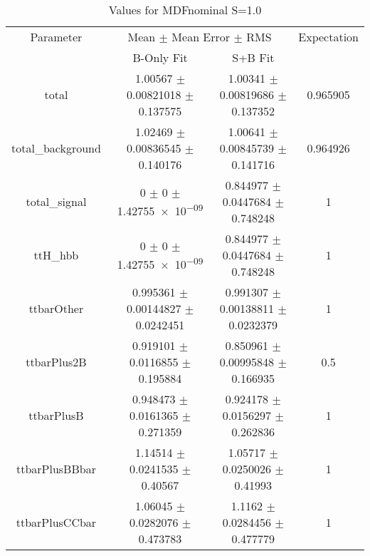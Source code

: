 \begin{table}
\centering
\caption{Values for MDFnominal S=1.0}
\begin{tabular}{cccc}
\toprule
Parameter & \multicolumn{2}{c}{Mean $\pm$ Mean Error $\pm$ RMS} & Expectation\\
 & B-Only Fit & S+B Fit & \\
\midrule
total & \num{1.00567} $\pm$ \num{0.00821018} $\pm$ \num{0.137575} & \num{1.00341} $\pm$ \num{0.00819686} $\pm$ \num{0.137352} & \num{0.965905}\\
total\_background & \num{1.02469} $\pm$ \num{0.00836545} $\pm$ \num{0.140176} & \num{1.00641} $\pm$ \num{0.00845739} $\pm$ \num{0.141716} & \num{0.964926}\\
total\_signal & \num{0} $\pm$ \num{0} $\pm$ \num{1.42755e-09} & \num{0.844977} $\pm$ \num{0.0447684} $\pm$ \num{0.748248} & \num{1}\\
ttH\_hbb & \num{0} $\pm$ \num{0} $\pm$ \num{1.42755e-09} & \num{0.844977} $\pm$ \num{0.0447684} $\pm$ \num{0.748248} & \num{1}\\
ttbarOther & \num{0.995361} $\pm$ \num{0.00144827} $\pm$ \num{0.0242451} & \num{0.991307} $\pm$ \num{0.00138811} $\pm$ \num{0.0232379} & \num{1}\\
ttbarPlus2B & \num{0.919101} $\pm$ \num{0.0116855} $\pm$ \num{0.195884} & \num{0.850961} $\pm$ \num{0.00995848} $\pm$ \num{0.166935} & \num{0.5}\\
ttbarPlusB & \num{0.948473} $\pm$ \num{0.0161365} $\pm$ \num{0.271359} & \num{0.924178} $\pm$ \num{0.0156297} $\pm$ \num{0.262836} & \num{1}\\
ttbarPlusBBbar & \num{1.14514} $\pm$ \num{0.0241535} $\pm$ \num{0.40567} & \num{1.05717} $\pm$ \num{0.0250026} $\pm$ \num{0.41993} & \num{1}\\
ttbarPlusCCbar & \num{1.06045} $\pm$ \num{0.0282076} $\pm$ \num{0.473783} & \num{1.1162} $\pm$ \num{0.0284456} $\pm$ \num{0.477779} & \num{1}\\
\bottomrule
\end{tabular}
\end{table}